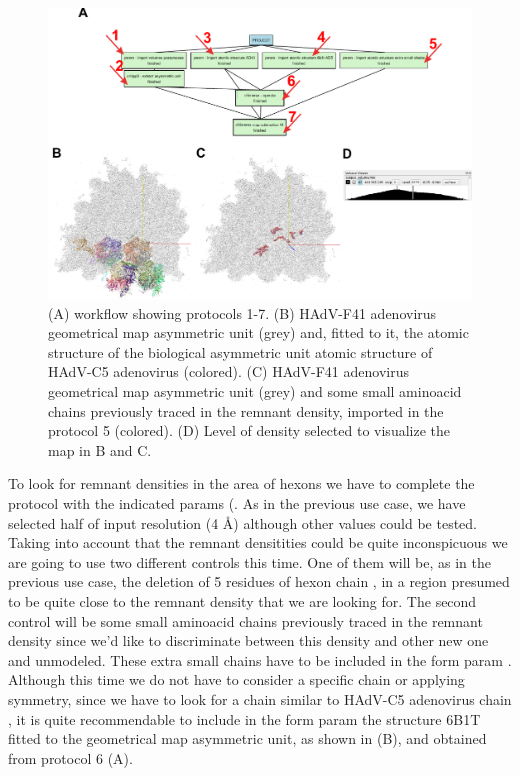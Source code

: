 \begin{itemize}
\begin{itemize}
                        \end{itemize}
                            \begin{figure}[H]
                            \centering 
                            \captionsetup{width=.9\linewidth} 
                            \includegraphics[width=.9\textwidth]{Images_appendix/Fig314.pdf}
                            \caption{(A) \scipion workflow showing protocols 1-7. (B) HAdV-F41 adenovirus geometrical map asymmetric unit (grey) and, fitted to it, the atomic structure of the biological asymmetric unit atomic structure of HAdV-C5 adenovirus (colored). (C) HAdV-F41 adenovirus geometrical map asymmetric unit (grey) and some small aminoacid chains previously traced in the remnant density, imported in the protocol 5 (colored). (D) Level of density selected to visualize the map in B and C. }  
                            \label{fig:app_usecase_mapsubtract_4}
                            \end{figure}
                         To look for remnant densities in the area of hexons we have to complete the  protocol with the indicated params (. As in the previous use case, we have selected half of input  resolution (4 \AA) although other values could be tested.\\Taking into account that the remnant densitities could be quite inconspicuous we are going to use two different controls this time. One of them will be, as in the previous use case, the deletion of 5 residues of hexon chain , in a region presumed to be quite close to the remnant density that we are looking for. The second control will be some small aminoacid chains previously traced in the remnant density since we'd like to discriminate between this density and other new one and unmodeled. These extra small chains have to be included in the form param .\\ Although this time we do not have to consider a specific chain or applying symmetry, since we have to look for a chain similar to HAdV-C5 adenovirus chain , it is quite recommendable to include in the form param  the structure 6B1T fitted to the geometrical map asymmetric unit, as shown in  (B), and obtained from protocol 6 (A). 
                            

\end{itemize}
